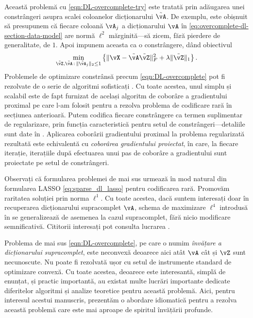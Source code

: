 \documentclass[../../book-main_ro.tex]{subfiles}
\begin{document}
Această problemă cu \eqref{eqn:DL-overcomplete-try} este tratată prin adăugarea
unei constrângeri asupra scalei coloanelor dicționarului $\tilde{\vA}$.
De exemplu, este obișnuit să presupunem că fiecare coloană $\vA_j$ a dicționarului
$\vA$ în \eqref{eq:overcomplete-dl-section-data-model} are normă $\ell^2$
mărginită---să zicem, fără pierdere de generalitate, de $1$.
Apoi impunem aceasta ca o constrângere, dând obiectivul
\begin{equation}
    \min_{\tilde{\vZ}, \tilde{\vA} \,:\, \norm{\tilde{\vA}_j}_2 \leq 1}
    \bc{\norm{\vX - \tilde{\vA}\tilde{\vZ}}_{F}^{2} + \lambda \norm{\tilde{\vZ}}_{1}}.
    \label{eqn:DL-overcomplete}
\end{equation}
Problemele de optimizare constrânsă precum \eqref{eqn:DL-overcomplete}
pot fi rezolvate de o serie de algoritmi sofisticați
\cite{nocedal2006numerical}. Cu toate acestea, unul simplu și scalabil este de fapt
furnizat de același algoritm de coborâre a gradientului proximal pe care l-am folosit pentru a rezolva
problema de codificare rară în secțiunea anterioară.
Putem codifica fiecare constrângere ca termen suplimentar de regularizare, prin
funcția caracteristică pentru setul de constrângeri---detaliile sunt date în
.
Aplicarea coborârii gradientului proximal la problema regularizată rezultată este
echivalentă cu \textit{coborârea gradientului proiectat}, în care, la fiecare iterație,
iterațiile după efectuarea unui pas de coborâre a gradientului sunt proiectate pe
setul de constrângeri.

\begin{remark}
Observați că formularea problemei de mai sus urmează în mod natural din
    formularea LASSO \eqref{eq:sparse_dl_lasso} pentru codificarea rară. Promovăm
    raritatea soluției prin norma \(\ell^1\). Cu toate acestea, dacă suntem interesați doar în recuperarea dicționarului supracomplet \(\vA\), schema de maximizare \(\ell^4\) introdusă în  se generalizează de asemenea la cazul supracomplet, fără nicio modificare semnificativă. Cititorii interesați pot consulta lucrarea \cite{Qu2020Geometric}. 
\end{remark}

Problema de mai sus \eqref{eqn:DL-overcomplete}, pe care o numim
\textit{învățare a dicționarului supracomplet}, este neconvexă deoarece aici atât \(\vA\) cât și
\(\vZ\) sunt necunoscute. Nu poate fi rezolvată ușor cu setul de instrumente standard de optimizare
convexă. Cu toate acestea, deoarece este interesantă, simplă de enunțat,
și practic importantă, au existat multe lucrări importante dedicate
diferitelor algoritmi și analize teoretice pentru această problemă. Aici, pentru
interesul acestui manuscris, prezentăm o abordare idiomatică pentru a rezolva această problemă
care este mai aproape de spiritul învățării profunde.
\end{document}
